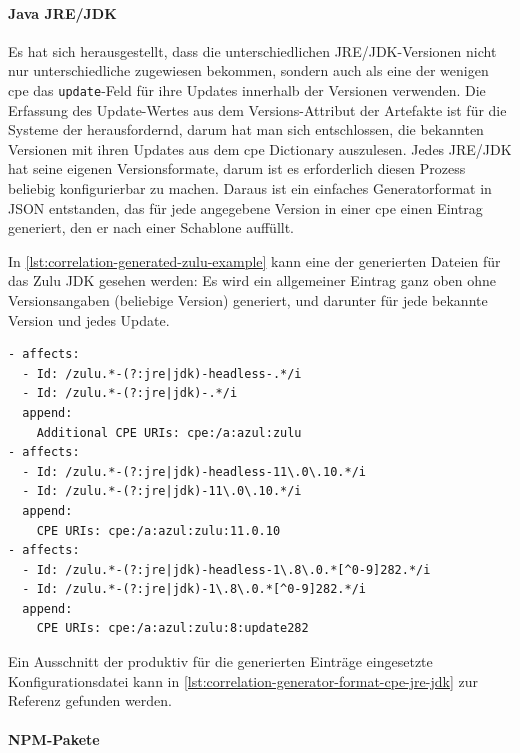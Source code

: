 \paragraph{Java JRE/JDK}
Es hat sich herausgestellt, dass die unterschiedlichen JRE/JDK-Versionen nicht nur unterschiedliche  zugewiesen bekommen, sondern auch als eine der wenigen \acrshort{cpe} das \texttt{update}-Feld für ihre Updates innerhalb der Versionen verwenden.
Die Erfassung des Update-Wertes aus dem Versions-Attribut der Artefakte ist für die Systeme der \metaeffektsp herausfordernd, darum hat man sich entschlossen, die bekannten Versionen mit ihren Updates aus dem \acrshort{cpe} Dictionary auszulesen.
Jedes JRE/JDK hat seine eigenen Versionsformate, darum ist es erforderlich diesen Prozess beliebig konfigurierbar zu machen.
Daraus ist ein einfaches Generatorformat in JSON entstanden, das für jede angegebene Version in einer \acrshort{cpe} einen Eintrag generiert, den er nach einer Schablone auffüllt.

In \autoref{lst:correlation-generated-zulu-example} kann eine der generierten Dateien für das Zulu JDK gesehen werden:
Es wird ein allgemeiner Eintrag ganz oben ohne Versionsangaben (beliebige Version) generiert, und darunter für jede bekannte Version und jedes Update.

\begin{lstlisting}[style=yaml,caption={Automatisch generierte Korrelationseinträge zu Zulu JDK},label={lst:correlation-generated-zulu-example}]
- affects:
  - Id: /zulu.*-(?:jre|jdk)-headless-.*/i
  - Id: /zulu.*-(?:jre|jdk)-.*/i
  append:
    Additional CPE URIs: cpe:/a:azul:zulu
- affects:
  - Id: /zulu.*-(?:jre|jdk)-headless-11\.0\.10.*/i
  - Id: /zulu.*-(?:jre|jdk)-11\.0\.10.*/i
  append:
    CPE URIs: cpe:/a:azul:zulu:11.0.10
- affects:
  - Id: /zulu.*-(?:jre|jdk)-headless-1\.8\.0.*[^0-9]282.*/i
  - Id: /zulu.*-(?:jre|jdk)-1\.8\.0.*[^0-9]282.*/i
  append:
    CPE URIs: cpe:/a:azul:zulu:8:update282
\end{lstlisting}

Ein Ausschnitt der produktiv für die generierten Einträge eingesetzte Konfigurationsdatei kann in \autoref{lst:correlation-generator-format-cpe-jre-jdk} zur Referenz gefunden werden.



\paragraph{NPM-Pakete}

